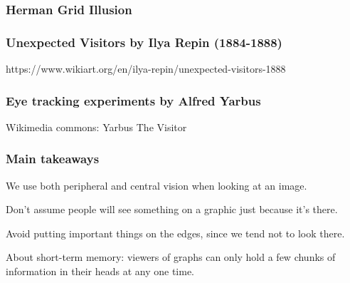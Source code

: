 \documentclass[12pt]{beamer}\usepackage[]{graphicx}\usepackage[]{color}
\begin{document}

\begin{frame}
\begin{center}
\Huge{}
\end{center}
\end{frame}


\begin{frame}
\frametitle{Herman Grid Illusion}
\begin{center}
\end{center}
\end{frame}


\begin{frame}
\frametitle{Unexpected Visitors by Ilya Repin (1884-1888)}
\begin{center}

{\lolit \scriptsize{https://www.wikiart.org/en/ilya-repin/unexpected-visitors-1888}}
\end{center}
\end{frame}


\begin{frame}
\frametitle{Eye tracking experiments by Alfred Yarbus}
\begin{center}

{\lolit \scriptsize{Wikimedia commons: Yarbus The Visitor}}
\end{center}
\end{frame}


\begin{frame}
\begin{center}
\Huge{}
\end{center}
\end{frame}


\begin{frame}
\frametitle{Main takeaways}

\bbi
  \item We use both peripheral and central vision when looking at an image.
  \item Don't assume people will see something on a graphic just because it's
  there.
  \item Avoid putting important things on the edges, since we tend not to
  look there.
  \item About short-term memory: viewers of graphs can only hold a few chunks
  of information in their heads at any one time.
\ei

\end{frame}
\end{document}

